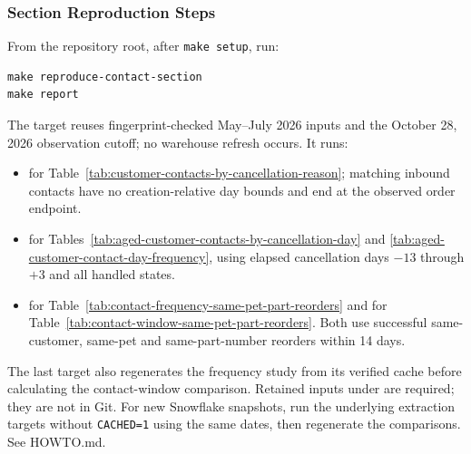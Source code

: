 \clearpage
\subsubsection{Section Reproduction Steps}\label{subsubsec:reproduce-contacts}
From the repository root, after \texttt{make setup}, run:
\begin{lstlisting}[basicstyle=\ttfamily\small,breaklines=true]
make reproduce-contact-section
make report
\end{lstlisting}
The target reuses fingerprint-checked May--July 2026 inputs and the October 28,
2026 observation cutoff; no warehouse refresh occurs. It runs:
\begin{itemize}[leftmargin=*]
\item {} for
Table~\ref{tab:customer-contacts-by-cancellation-reason}; matching inbound
contacts have no creation-relative day bounds and end at the observed order endpoint.
\item {} for
Tables~\ref{tab:aged-customer-contacts-by-cancellation-day} and
\ref{tab:aged-customer-contact-day-frequency}, using elapsed cancellation days
$-13$ through $+3$ and all handled states.
\item {} for
Table~\ref{tab:contact-frequency-same-pet-part-reorders} and
 for
Table~\ref{tab:contact-window-same-pet-part-reorders}. Both use successful
same-customer, same-pet and same-part-number reorders within 14 days.
\end{itemize}
The last target also regenerates the frequency study from its verified cache
before calculating the contact-window comparison. Retained inputs under
 are required; they are not in Git. For new Snowflake
snapshots, run the underlying extraction targets without \texttt{CACHED=1}
using the same dates, then regenerate the comparisons. See HOWTO.md.
